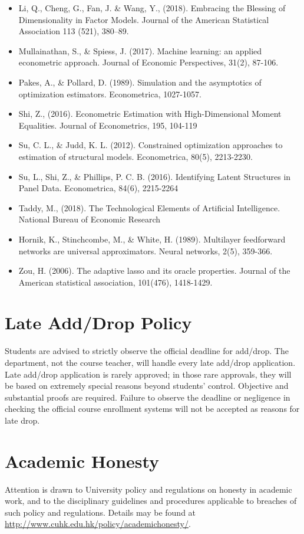 \documentclass[11pt]{article}
\begin{document}
\begin{itemize}
\item Li, Q., Cheng, G., Fan, J. \& Wang, Y., (2018). Embracing the Blessing of Dimensionality in Factor Models. Journal of the American Statistical Association 113 (521), 380–89.
\item Mullainathan, S., \& Spiess, J. (2017). Machine learning: an applied econometric approach. Journal of Economic Perspectives, 31(2), 87-106.
\item Pakes, A., \& Pollard, D. (1989). Simulation and the asymptotics of optimization estimators. Econometrica, 1027-1057. 
\item Shi, Z., (2016). Econometric Estimation with High-Dimensional Moment Equalities. Journal of Econometrics, 195, 104-119 
\item Su, C. L., \& Judd, K. L. (2012). Constrained optimization approaches to estimation of structural models. Econometrica, 80(5), 2213-2230.
\item Su, L., Shi, Z., \& Phillips, P. C. B. (2016). Identifying Latent Structures in Panel Data. Econometrica, 84(6), 2215-2264
\item Taddy, M., (2018). The Technological Elements of Artificial Intelligence. National Bureau of Economic Research 
\item Hornik, K., Stinchcombe, M., \& White, H. (1989). Multilayer feedforward networks are universal approximators. Neural networks, 2(5), 359-366.
\item Zou, H. (2006). The adaptive lasso and its oracle properties. Journal of the American statistical association, 101(476), 1418-1429.
\end{itemize}



\section*{Late Add/Drop Policy}

Students are advised to strictly observe the official deadline for add/drop. The department, not the course teacher, will handle every late add/drop application. Late add/drop application is rarely approved; in those rare approvals, they will be based on extremely special reasons beyond students' control. Objective and substantial proofs are required. Failure to observe the deadline or negligence in checking the official course enrollment systems will not be accepted as reasons for late drop.


\section*{Academic Honesty}
Attention is drawn to University policy and regulations on honesty in academic work, and to the disciplinary guidelines and procedures applicable to breaches of such policy and regulations. Details may be found at \url{http://www.cuhk.edu.hk/policy/academichonesty/}. 
\end{document}
